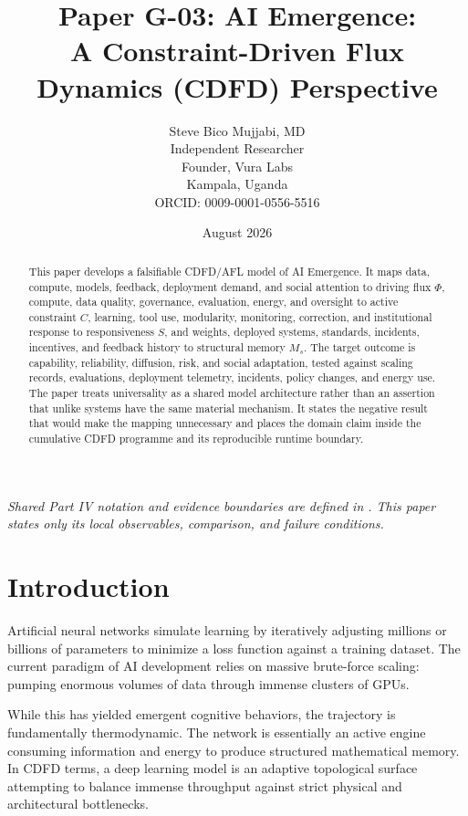 \documentclass[11pt,a4paper]{article}
\title{\textbf{Paper G-03: AI Emergence:\\ A Constraint-Driven Flux Dynamics (CDFD) Perspective}}
\author{Steve Bico Mujjabi, MD\\
\small Independent Researcher\\
\small Founder, Vura Labs\\
\small Kampala, Uganda\\
\small ORCID: 0009-0001-0556-5516}
\date{August 2026}
\begin{document}
\maketitle

\noindent\textit{Shared Part IV notation and evidence boundaries are defined in . This paper states only its local observables, comparison, and failure conditions.}


\begin{abstract}
This paper develops a falsifiable CDFD/AFL model of AI Emergence. It maps data, compute, models, feedback, deployment demand, and social attention to driving flux $\Phi$, compute, data quality, governance, evaluation, energy, and oversight to active constraint $C$, learning, tool use, modularity, monitoring, correction, and institutional response to responsiveness $S$, and weights, deployed systems, standards, incidents, incentives, and feedback history to structural memory $M_s$. The target outcome is capability, reliability, diffusion, risk, and social adaptation, tested against scaling records, evaluations, deployment telemetry, incidents, policy changes, and energy use. The paper treats universality as a shared model architecture rather than an assertion that unlike systems have the same material mechanism. It states the negative result that would make the mapping unnecessary and places the domain claim inside the cumulative CDFD programme and its reproducible runtime boundary.
\end{abstract}

\section{Introduction}

Artificial neural networks simulate learning by iteratively adjusting millions or billions of parameters to minimize a loss function against a training dataset. The current paradigm of AI development relies on massive brute-force scaling: pumping enormous volumes of data through immense clusters of GPUs.

While this has yielded emergent cognitive behaviors, the trajectory is fundamentally thermodynamic. The network is essentially an active engine consuming information and energy to produce structured mathematical memory. In CDFD terms, a deep learning model is an adaptive topological surface attempting to balance immense throughput against strict physical and architectural bottlenecks.
\end{document}
